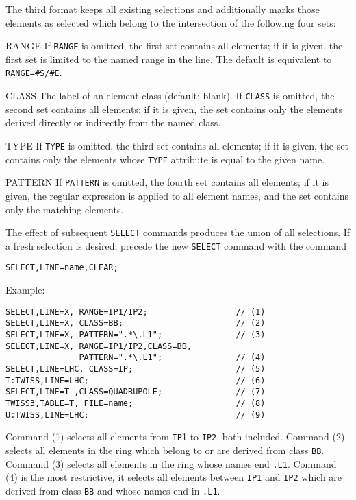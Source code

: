 The third format keeps all existing selections and additionally marks those
elements as selected which belong to the intersection of the following four
sets:
\begin{kdescription}
\item[RANGE]
  If \texttt{RANGE} is omitted, the first set contains all elements;
  if it is given, the first set is limited to the named range in the line.
  The default is equivalent to \texttt{RANGE=\#S/\#E}.
\item[CLASS]
  The {label}  of an element class (default: blank).
  If \texttt{CLASS} is omitted, the second set contains all elements;
  if it is given, the set contains only the elements derived directly or
  indirectly from the named class.
\item[TYPE]
  If \texttt{TYPE} is omitted, the third set contains all elements;
  if it is given, the set contains only the elements whose \texttt{TYPE}
  attribute is equal to the given name.
\item[PATTERN]
  If \texttt{PATTERN} is omitted, the fourth set contains all elements;
  if it is given, the {regular expression} 
  is applied to all element names, and the set contains only the matching
  elements.
\end{kdescription}
The effect of subsequent \texttt{SELECT} commands produces the union of all
selections.
If a fresh selection is desired, precede the new \texttt{SELECT} command
with the command
\begin{verbatim}
SELECT,LINE=name,CLEAR;
\end{verbatim}
Example:
\begin{verbatim}
SELECT,LINE=X, RANGE=IP1/IP2;                  // (1)
SELECT,LINE=X, CLASS=BB;                       // (2)
SELECT,LINE=X, PATTERN=".*\.L1";               // (3)
SELECT,LINE=X, RANGE=IP1/IP2,CLASS=BB,
               PATTERN=".*\.L1";               // (4)
SELECT,LINE=LHC, CLASS=IP;                     // (5)
T:TWISS,LINE=LHC;                              // (6)
SELECT,LINE=T ,CLASS=QUADRUPOLE;               // (7)
TWISS3,TABLE=T, FILE=name;                     // (8)
U:TWISS,LINE=LHC;                              // (9)
\end{verbatim}
Command (1) selects all elements from \texttt{IP}1 to \texttt{IP2},
both included.
Command (2) selects all elements in the ring which belong to or are
derived from class \texttt{BB}.
Command (3) selects all elements in the ring whose names end \texttt{.L1}.
Command (4) is the most restrictive, it selects all elements
between \texttt{IP1} and \texttt{IP2} which are derived from class
\texttt{BB} and whose names end in \texttt{.L1}.

